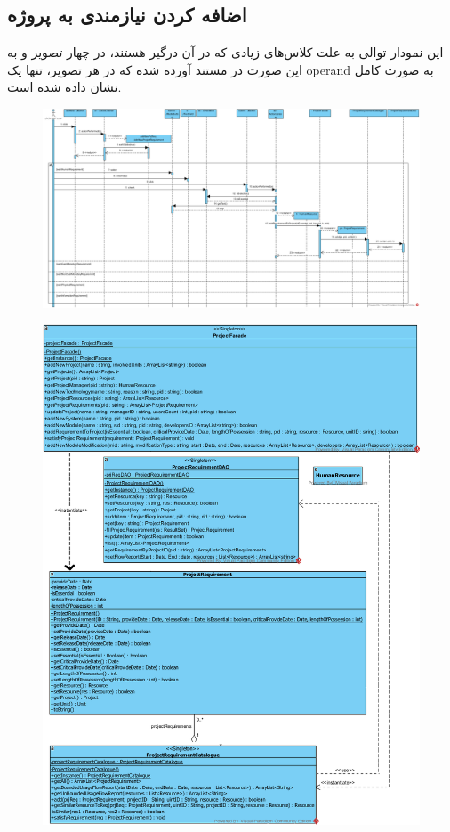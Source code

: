 \begin{landscape}
\section{اضافه کردن نیازمندی به پروژه}
این نمودار توالی به علت کلاس‌های زیادی که در آن درگیر هستند، در چهار تصویر و به این صورت در مستند آورده شده که در هر تصویر، تنها یک operand به صورت کامل نشان داده شده است.
\begin{figure}[H]
	\centering
	\includegraphics[scale=0.5]{img/sequence-design/AddRequirementToProject_HUMAN}
\end{figure}
\begin{figure}[H]
	\centering
	\includegraphics[scale=0.5]{img/sequence-design/AddRequirementToProject_HUMANC}

\end{figure}
\end{landscape}
